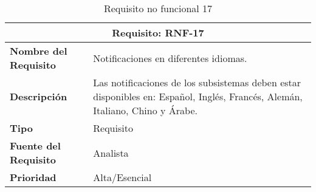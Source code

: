 \begin{table}[H]
\begin{center}
\begin{tabular}{p{} p{7cm}}
\multicolumn{2}{c}{\textbf{Requisito: RNF-17} } \\
\hline \hline
\textbf{Nombre del Requisito} & Notificaciones en diferentes idiomas.\\
\hline
\textbf{Descripción} & Las notificaciones de los subsistemas deben estar disponibles en: Español, Inglés, Francés, Alemán, Italiano, Chino y Árabe.\\
\hline
\textbf{Tipo} & Requisito  \\
\hline
\textbf{Fuente del Requisito} & Analista  \\
\hline
\textbf{Prioridad} & Alta/Esencial \\ \hline
\end{tabular}
\caption{Requisito no funcional 17}
\label{tab:RNF-17}
\end{center}
\end{table}

